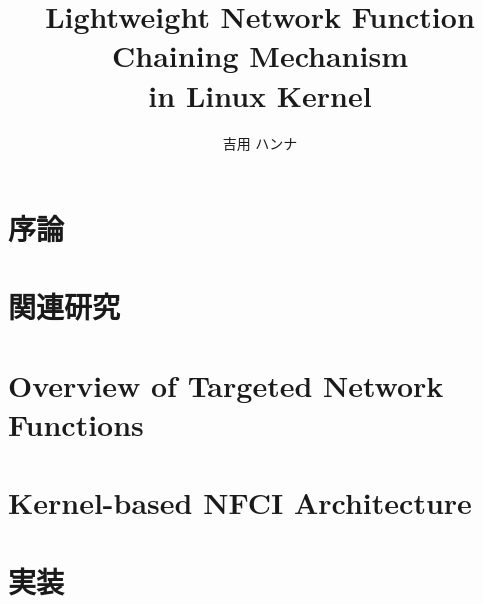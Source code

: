 \documentclass[12pt]{b-thesis}
\begin{document}
\title{Lightweight Network Function Chaining Mechanism \\ in Linux Kernel}
\author{吉用 ハンナ}
\maketitle

 
\makejabstract 

\clearpage


\setcounter{page}{1}

\tableofcontents
\thispagestyle{plain}

\listoffigures   %
\listoftables    %

\clearpage

\pagestyle{headings}
\setcounter{page}{1}

\clearpage

\chapter{序論}
\label{chap:intro}


\chapter{関連研究}
\label{chap:related}


\chapter{Overview of Targeted Network Functions}
\label{chap:overview}


\chapter{Kernel-based NFCI Architecture}
\label{chap:architecture}


\chapter{実装}
\label{chap:implementation}

\end{document}
